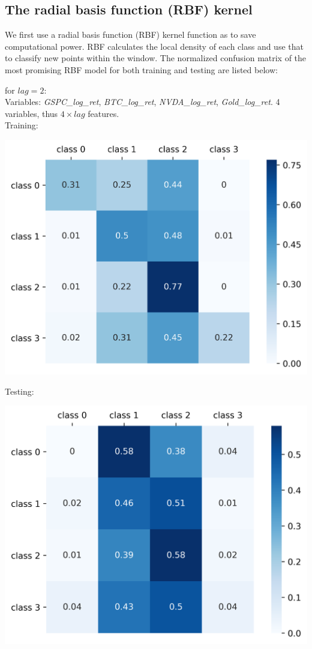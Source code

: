 \documentclass[9pt,twocolumn,twoside]{ilcss}
\begin{document}
\subsection*{The radial basis function (RBF) kernel}
We first use a radial basis function (RBF) kernel function as to save computational power. RBF calculates the local density of each class and use that to classify new points within the window. The normalized confusion matrix of the most promising RBF model for both training and testing are listed below:

\noindent  for $lag = 2$:
\smallskip\\
Variables: \textit{GSPC\_log\_ret}, \textit{BTC\_log\_ret}, \textit{NVDA\_log\_ret}, \textit{Gold\_log\_ret}. 4 variables, thus $4\times lag$ features.
\smallskip\\
Training:

\begin{center}
\includegraphics[scale=0.35]{train_cfs_mat_2_rbf.png}
\end{center}
Testing:

\begin{center}
\includegraphics[scale=0.35]{test_cfs_mat_2_rbf.png}
\end{center}
\end{document}
